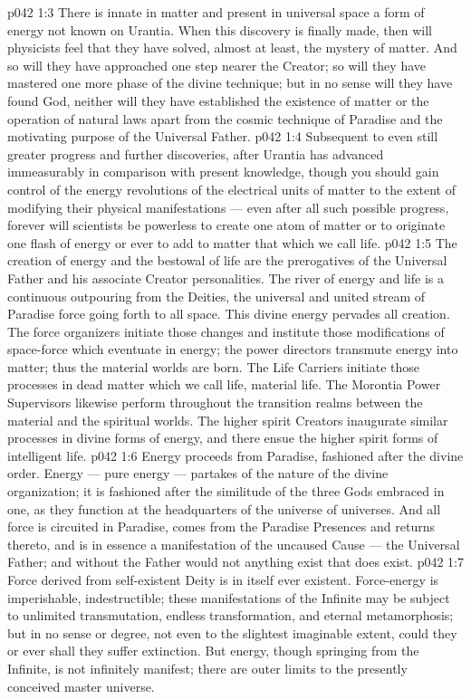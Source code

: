 \vs p042 1:3 \pc There is innate in matter and present in universal space a form of energy not known on Urantia. When this discovery is finally made, then will physicists feel that they have solved, almost at least, the mystery of matter. And so will they have approached one step nearer the Creator; so will they have mastered one more phase of the divine technique; but in no sense will they have found God, neither will they have established the existence of matter or the operation of natural laws apart from the cosmic technique of Paradise and the motivating purpose of the Universal Father.
\vs p042 1:4 Subsequent to even still greater progress and further discoveries, after Urantia has advanced immeasurably in comparison with present knowledge, though you should gain control of the energy revolutions of the electrical units of matter to the extent of modifying their physical manifestations --- even after all such possible progress, forever will scientists be powerless to create one atom of matter or to originate one flash of energy or ever to add to matter that which we call life.
\vs p042 1:5 \pc The creation of energy and the bestowal of life are the prerogatives of the Universal Father and his associate Creator personalities. The river of energy and life is a continuous outpouring from the Deities, the universal and united stream of Paradise force going forth to all space. This divine energy pervades all creation. The force organizers initiate those changes and institute those modifications of space\hyp{}force which eventuate in energy; the power directors transmute energy into matter; thus the material worlds are born. The Life Carriers initiate those processes in dead matter which we call life, material life. The Morontia Power Supervisors likewise perform throughout the transition realms between the material and the spiritual worlds. The higher spirit Creators inaugurate similar processes in divine forms of energy, and there ensue the higher spirit forms of intelligent life.
\vs p042 1:6 \pc Energy proceeds from Paradise, fashioned after the divine order. Energy --- pure energy --- partakes of the nature of the divine organization; it is fashioned after the similitude of the three Gods embraced in one, as they function at the headquarters of the universe of universes. And all force is circuited in Paradise, comes from the Paradise Presences and returns thereto, and is in essence a manifestation of the uncaused Cause --- the Universal Father; and without the Father would not anything exist that does exist.
\vs p042 1:7 Force derived from self\hyp{}existent Deity is in itself ever existent. Force\hyp{}energy is imperishable, indestructible; these manifestations of the Infinite may be subject to unlimited transmutation, endless transformation, and eternal metamorphosis; but in no sense or degree, not even to the slightest imaginable extent, could they or ever shall they suffer extinction. But energy, though springing from the Infinite, is not infinitely manifest; there are outer limits to the presently conceived master universe.
